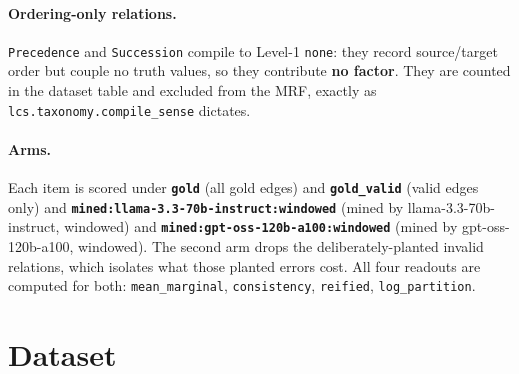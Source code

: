 \documentclass[11pt]{article}
\begin{document}
\paragraph{Ordering-only relations.} \texttt{Precedence} and \texttt{Succession} compile to Level-1 \texttt{none}: they record source/target order but couple no truth values, so they contribute \textbf{no factor}. They are counted in the dataset table and excluded from the MRF, exactly as \texttt{lcs.taxonomy.compile\_sense} dictates.

\paragraph{Arms.} Each item is scored under \textbf{\texttt{gold}} (all gold edges) and \textbf{\texttt{gold\_valid}} (valid edges only) and \textbf{\texttt{mined:llama-3.3-70b-instruct:windowed}} (mined by llama-3.3-70b-instruct, windowed) and \textbf{\texttt{mined:gpt-oss-120b-a100:windowed}} (mined by gpt-oss-120b-a100, windowed). The second arm drops the deliberately-planted invalid relations, which isolates what those planted errors cost. All four readouts are computed for both: \texttt{mean\_marginal}, \texttt{consistency}, \texttt{reified}, \texttt{log\_partition}.

\section{Dataset}
\end{document}
